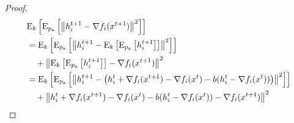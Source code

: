 \documentclass{article}
\newcommand{\alexander}[1]{\todo[inline]{\textbf{Alexander: }#1}}
\newcommand*{\probavailable}{\ensuremath{p_{\textnormal{a}}}}
\begin{document}
\begin{proof}
  \begin{align*}
    &\ExpSub{k}{\ExpSub{\probavailable}{\norm{h^{t+1}_i - \nabla f_i(x^{t+1})}^2}} \\
    &=\ExpSub{k}{\ExpSub{\probavailable}{\norm{h^{t+1}_i - \ExpSub{k}{\ExpSub{\probavailable}{h^{t+1}_i}}}^2}} \\
    &\quad + \norm{\ExpSub{k}{\ExpSub{\probavailable}{h^{t+1}_i}} - \nabla f_i(x^{t+1})}^2 \\
    &=\ExpSub{k}{\ExpSub{\probavailable}{\norm{h^{t+1}_i - \left(h^{t}_i + \nabla f_i(x^{t+1}) - \nabla f_i(x^{t}) - b(h^t_i - \nabla f_i(x^{t}))\right)}^2}} \\
    &\quad + \norm{h^{t}_i + \nabla f_i(x^{t+1}) - \nabla f_i(x^{t}) - b(h^t_i - \nabla f_i(x^{t})) - \nabla f_i(x^{t+1})}^2 \\

\end{align*}
\end{proof}
\end{document}
